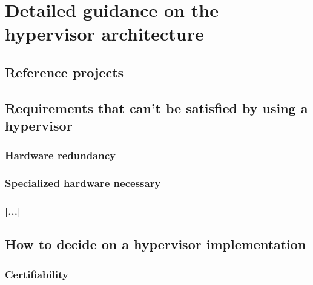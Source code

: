 
\chapter{Detailed guidance on the hypervisor architecture} %

\label{Chapter5} %


\newcommand{\keyword}[1]{\textbf{#1}}
\newcommand{\tabhead}[1]{\textbf{#1}}
\newcommand{\code}[1]{\texttt{#1}}
\newcommand{\file}[1]{\texttt{\bfseries#1}}
\newcommand{\option}[1]{\texttt{\itshape#1}}


\section{Reference projects}


\section{Requirements that can't be satisfied by using a hypervisor}
\subsection{Hardware redundancy}
\subsection{Specialized hardware necessary}
\subsection{[...]}


\section{How to decide on a hypervisor implementation}
\subsection{Certifiability}
